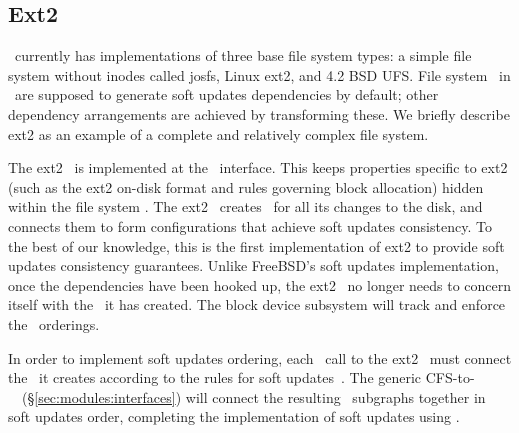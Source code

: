 \subsection{Ext2}
\label{sec:modules:ext2}

\Kudos\ currently has implementations of three base file system types: a simple
file system without inodes called josfs, Linux ext2, and 4.2 BSD UFS. File
system \modules\ in \Kudos\ are supposed to generate soft updates dependencies
by default; other dependency arrangements are achieved by transforming these.
We briefly describe ext2 as an example of a complete and relatively complex file
system.

The ext2 \module\ is implemented at the \LFS\ interface. This keeps properties
specific to ext2 (such as the ext2 on-disk format and rules governing block
allocation) hidden within the file system \module. The ext2 \module\ creates
\chdescs\ for all its changes to the disk, and connects them to form
configurations that achieve soft updates consistency. To the best of our
knowledge, this is the first implementation of ext2 to provide soft updates
consistency guarantees. Unlike FreeBSD's soft updates implementation, once the
dependencies have been hooked up, the ext2 \module\ no longer needs to concern
itself with the \chdescs\ it has created. The block device subsystem will track
and enforce the \chdesc\ orderings.

In order to implement soft updates ordering, each \LFS\ call to the ext2
\module\ must connect the \chdescs\ it creates according to the rules for soft
updates~\cite{ganger00soft}. The generic CFS-to-\LFS\ \module\ (\S\ref{sec:modules:interfaces})
will connect the resulting \chdesc\ subgraphs together in soft updates order,
completing the implementation of soft updates using \chdescs.
